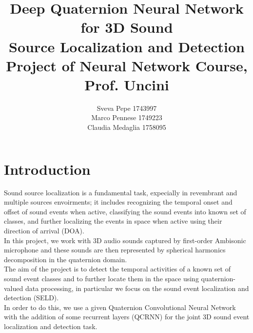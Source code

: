 \documentclass{article}
\title{Deep Quaternion Neural Network for 3D Sound \\ Source Localization and Detection
\\ \large{\vspace{0.4cm}Project of Neural Network Course, Prof. Uncini}}
\author{Sveva Pepe 1743997 \\  Marco Pennese 1749223 \\  Claudia Medaglia 1758095}
\date{}
\begin{document}
    \maketitle
    \section{Introduction}
    Sound source localization is a fundamental task, expecially in revembrant and multiple sources envoirments; it includes recognizing the temporal onset and offset of sound events when active, classifying the sound events into known set of classes, and further localizing the events in space when active using their direction of arrival (DOA).\\
    In this project, we work with 3D audio sounds captured by first-order Ambisonic microphone and these sounds are then represented 
    by spherical harmonics decomposition in the quaternion domain.
    \\ The aim of the project is to detect the temporal activities of a known set of sound event classes and to further locate them in 
    the space using quaternion-valued data processing, in particular we focus on the sound event localization and detection (SELD). 
    \\ In order to do this, we use a given Quaternion Convolutional Neural Network with the addition of some recurrent layers (QCRNN) 
    for the joint 3D sound event localization and detection task.
\end{document}
